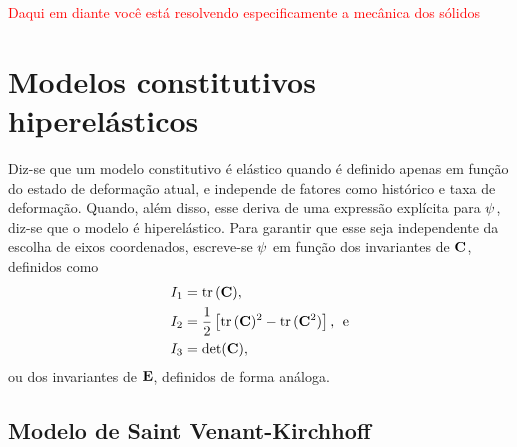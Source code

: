 \documentclass[Tese.tex]{subfiles}
\begin{document}
\textcolor{red}{Daqui em diante você está resolvendo especificamente a mecânica dos sólidos}

\section{Modelos constitutivos hiperelásticos}\label{sec:hiper}

Diz-se que um modelo constitutivo é elástico quando é definido apenas em função do estado de deformação atual, e independe de fatores como histórico e taxa de deformação. Quando, além disso, esse deriva de uma expressão explícita para $\psi$, diz-se que o modelo é hiperelástico. Para garantir que esse seja independente da escolha de eixos coordenados, escreve-se $\psi$ em função dos invariantes de $\mathbf{C}$, definidos como
\begin{align}
& I_1 = \text{tr}\,(\mathbf{C}) ,\\
& I_2 = \dfrac{1}{2}\left[\text{tr}\,(\mathbf{C})^2-\text{tr}\,(\mathbf{C}^2)\right] \text{,\; e}\\
& I_3 = \det(\mathbf{C}),
\end{align}
ou dos invariantes de $\mathbf{E}$, definidos de forma análoga.

\subsection{Modelo de Saint Venant-Kirchhoff}
\end{document}
